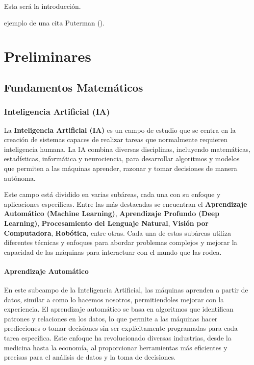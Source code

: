 \documentclass[
  spanish,
  letterpaper,
]{scrreprt}
\theoremstyle{definition}
\theoremstyle{remark}
\begin{document}
Esta será la introducción.

ejemplo de una cita Puterman ().

\part{Preliminares}

\chapter{Fundamentos Matemáticos}\label{fundamentos-matemuxe1ticos}

\section{Inteligencia Artificial (IA)}\label{inteligencia-artificial-ia}

La \textbf{Inteligencia Artificial (IA)} es un campo de estudio que se
centra en la creación de sistemas capaces de realizar tareas que
normalmente requieren inteligencia humana. La IA combina diversas
disciplinas, incluyendo matemáticas, estadísticas, informática y
neurociencia, para desarrollar algoritmos y modelos que permiten a las
máquinas aprender, razonar y tomar decisiones de manera autónoma.

Este campo está dividido en varias subáreas, cada una con su enfoque y
aplicaciones específicas. Entre las más destacadas se encuentran el
\textbf{Aprendizaje Automático (Machine Learning)}, \textbf{Aprendizaje
Profundo (Deep Learning)}, \textbf{Procesamiento del Lenguaje Natural},
\textbf{Visión por Computadora}, \textbf{Robótica}, entre otras. Cada
una de estas subáreas utiliza diferentes técnicas y enfoques para
abordar problemas complejos y mejorar la capacidad de las máquinas para
interactuar con el mundo que las rodea.

\subsection{Aprendizaje Automático}\label{aprendizaje-automuxe1tico}

En este subcampo de la Inteligencia Artificial, las máquinas aprenden a
partir de datos, similar a como lo hacemos nosotros, permitiendoles
mejorar con la experiencia. El aprendizaje automático se basa en
algoritmos que identifican patrones y relaciones en los datos, lo que
permite a las máquinas hacer predicciones o tomar decisiones sin ser
explícitamente programadas para cada tarea específica. Este enfoque ha
revolucionado diversas industrias, desde la medicina hasta la economía,
al proporcionar herramientas más eficientes y precisas para el análisis
de datos y la toma de decisiones.
\end{document}

